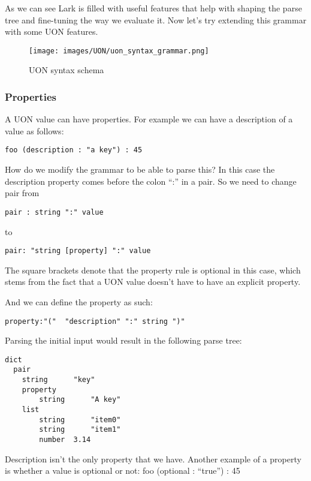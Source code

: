 \documentclass[12pt]{article}
\begin{document}
As we can see Lark is filled with useful features that help with shaping the parse tree and fine-tuning the way we evaluate it. Now let’s try extending this grammar with some UON features.

\begin{figure}[ht!]
 	\centering
 	\caption{UON syntax schema}
 	\texttt{[image: images/UON/uon\_syntax\_grammar.png]}
 	\label{lab:perceptron}
\end{figure}

\subsubsection{Properties}
A UON value can have properties. For example we can have a description of a value as follows:
\begin{lstlisting}
foo (description : "a key") : 45
\end{lstlisting}

How do we modify the grammar to be able to parse this? In this case the description property comes before the colon “:” in a pair. So we need to change pair from 

\begin{lstlisting}
pair : string ":" value
\end{lstlisting}

to

\begin{lstlisting}
pair: "string [property] ":" value
\end{lstlisting}
The square brackets denote that the property rule is optional in this case, which stems from the fact that a UON value doesn’t have to have an explicit property.

And we can define the property as such:

\begin{lstlisting}
property:"("  "description" ":" string ")"
\end{lstlisting}

Parsing the initial input would result in the following parse tree:

\begin{lstlisting}
dict
  pair
    string      "key"
    property
        string      "A key"
    list
        string      "item0"
        string      "item1"
        number  3.14
\end{lstlisting}

Description isn’t the only property that we have. Another example of a property is whether a value is optional or not:
foo (optional : “true”) : 45
\end{document}
